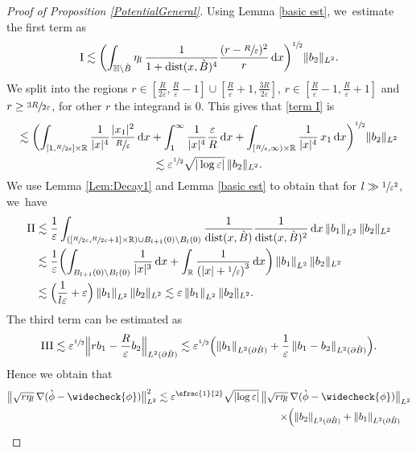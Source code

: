\documentclass[JEP,XML,SOM,Unicode,published]{cedram}
\let\epsilon\varepsilon
\let\backslash\setminus
\newcommand{\rI}{\mathrm{I}}
\newcommand{\rII}{\mathrm{II}}
\newcommand{\rIII}{\mathrm{III}}
\theoremstyle{definition}
\DeclareMathOperator{\dist}{dist}
\newcommand\R{\mathbb{R}}
\newcommand\norm[1]{\left\lVert #1\right\rVert}
\newcommand\anorm[1]{\lVert #1\rVert}
\newcommand\bnorm[1]{\bigl\lVert #1\bigr\rVert}
\newcommand\Bnorm[1]{\Bigl\lVert #1\Bigr\rVert}
\newcommand\dd{\,\mathrm{d}}
\newcommand\dx{\dd x}
\let\chek\widecheck
\let\de\partial
\let\eps\epsilon
\begin{document}
\begin{proof}[Proof of Proposition \ref{PotentialGeneral}]
Using Lemma \ref{basic est}, we~estimate the first term as
\begin{align}\label{term I}
\rI\lesssim \biggl(\int_{\mathbb{H}\backslash\grave{B}}\eta_l\,\frac{1}{1+\dist(x,\grave{B})^4}\frac{(r-\sfrac{R}{\eps})^2}{r}\dx\biggr)^{\sfrac{1}{2}}\anorm{b_2}_{L^2}.
\end{align}
We split into the regions $ r\in [\frac{R}{2\eps},\frac{R}{\eps}-1]\cup [\frac{R}{\eps}+1,\frac{3R}{2\eps}]$, $r\in [ \frac{R}{\eps}-1,\frac{R}{\eps}+1]$ and $r\geq \sfrac{3R}{2\eps}$, for other $r$ the integrand is $0$. This gives that \eqref{term I} is
\begin{multline*}
\lesssim\biggl(\int_{[1,\sfrac{R}{2\eps}]\times\R}\frac{1}{|x|^4}\frac{|x_1|^2}{\sfrac{R}{\eps}}\dx+\int_{1}^\infty\frac{1}{|x|^4}{\frac{\eps}{R}}\dx+\int_{[\sfrac{R}{\eps},\infty)\times \R}\frac{1}{|x|^4}\,x_1\dx\biggr)^{\sfrac{1}{2}}\anorm{b_2}_{L^2}\\
\lesssim \eps^{\sfrac{1}{2}}\sqrt{|\log \eps|}\,\anorm{b_2}_{L^2}.
\end{multline*}
We use Lemma \ref{Lem:Decay1} and Lemma \ref{basic est} to obtain that for $l\gg\sfrac{1}{\eps^2}$, we~have
\begin{align*}
\rII&\lesssim \frac{1}{\eps}\int_{\left([\sfrac{R}{2\eps},\sfrac{R}{2\eps}+1]\times \R\right)\cup B_{l+1}(0)\backslash B_l(0)}\frac{1}{\dist(x,\grave{B})}\frac{1}{\dist(x,\grave{B})^2}\dx\norm{b_1}_{L^2}\anorm{b_2}_{L^2}\\
&\lesssim \frac{1}{\eps}\biggl(\int_{B_{l+1}(0)\backslash B_l(0)}\frac{1}{|x|^3}\dx+\int_\R\frac{1}{\left(|x|+\sfrac{1}{\eps}\right)^3}\dx\biggr)\norm{b_1}_{L^2}\anorm{b_2}_{L^2}\\
&\lesssim \Bigl(\frac{1}{l\eps}+\eps\Bigr)\norm{b_1}_{L^2}\anorm{b_2}_{L^2}\lesssim \eps\norm{b_1}_{L^2}\anorm{b_2}_{L^2}.
\end{align*}
The third term can be estimated as
\begin{align*}
\rIII\lesssim \eps^{\sfrac{1}{2}}\Bnorm{rb_1-\frac{R}{\eps}b_2}_{L^2(\de \grave{B})}\lesssim \eps^{\sfrac12}\Bigl(\norm{b_1}_{L^2(\de\grave{B})}+\frac{1}{\eps}\norm{b_1-b_2}_{L^2(\de\grave{B})}\Bigr).
\end{align*}
Hence we obtain that
\begin{multline*}
\bnorm{\sqrt{r\eta_l}\,\nabla(\grave{\phi}-\chek{\phi})}_{L^2}^2\lesssim \eps^{\sfrac{1}{2}}\sqrt{|{\log\eps}|}\,\bnorm{\sqrt{r\eta_l}\,\nabla(\grave{\phi}-\chek{\phi})}_{L^2}\\
\shoveright{\times\Bigl(\anorm{b_2}_{L^2(\de\grave{B})}+\norm{b_1}_{L^2(\de\grave{B})}
}
\end{multline*}
\end{proof}
\end{document}

